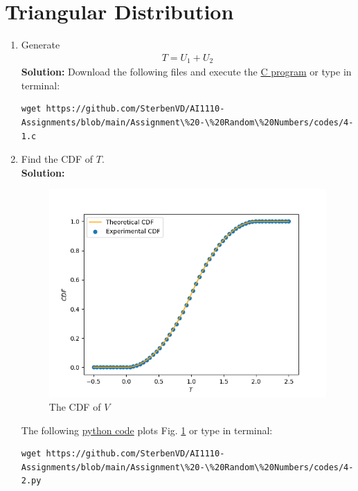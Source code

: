 \documentclass[journal,12pt,twocolumn]{IEEEtran}
\numberwithin{equation}{section}
\renewcommand\thesection{\arabic{section}}
\providecommand{\gitlink}[2]{{\color{blue}\href{https://github.com/SterbenVD/AI1110-Assignments/blob/main/Assignment\%20-\%20Random\%20Numbers/#1}{#2}}}
\newcommand{\solution}{\noindent \textbf{Solution: }}
\begin{document}
\section{Triangular Distribution}
\begin{enumerate}[label=\thesection.\arabic*
        ,ref=\thesection.\theenumi]
    \item Generate
          \begin{align}
              T = U_1+U_2
          \end{align}
          \solution Download the following files and execute the \gitlink{codes/4-1.c}{C program} or type in terminal:
          \begin{lstlisting}
wget https://github.com/SterbenVD/AI1110-Assignments/blob/main/Assignment\%20-\%20Random\%20Numbers/codes/4-1.c
            \end{lstlisting}
    \item Find the CDF of $T$.
          \\
          \solution
          \begin{figure}[H]
              \centering
              \includegraphics[width = \columnwidth]{../figs/4_cdf}
              \caption{The CDF of $V$}
              \label{fig:4_cdf}
          \end{figure}
          The following \gitlink{codes/4-2.py}{python code} plots Fig. \ref{fig:4_cdf} or type in terminal:
          \begin{lstlisting}
wget https://github.com/SterbenVD/AI1110-Assignments/blob/main/Assignment\%20-\%20Random\%20Numbers/codes/4-2.py
            \end{lstlisting}

\end{enumerate}
\end{document}

